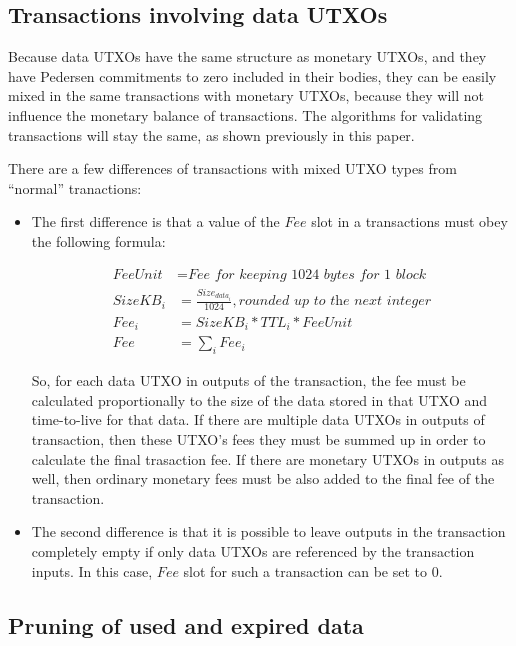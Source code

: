 \documentclass[a4paper, 10pt, conference]{ieeeconf}
\begin{document}
\subsection{Transactions involving data UTXOs}

Because data UTXOs have the same structure as monetary UTXOs, and they have Pedersen commitments to zero included in their bodies, they can be easily mixed in the same transactions with monetary UTXOs, because they will not influence the monetary balance of transactions. The algorithms for validating transactions will stay the same, as shown previously in this paper.

There are a few differences of transactions with mixed UTXO types from ``normal'' tranactions:

\begin{itemize}

	\item{The first difference is that a value of the $Fee$ slot in a transactions must obey the following formula:

	\begin{align*}
		FeeUnit &= \textit{Fee for keeping 1024 bytes for 1 block} \\
		SizeKB_i &= \frac{Size_{data_i}}{1024}, \textit{rounded up to the next integer}\\
		Fee_i &= SizeKB_i * TTL_i * FeeUnit\\
		Fee &= \sum_i Fee_i
	\end{align*}

	So, for each data UTXO in outputs of the transaction, the fee must be calculated proportionally to the size of the data stored in that UTXO and time-to-live for that data. If there are multiple data UTXOs in outputs of transaction, then these UTXO's fees they must be summed up in order to calculate the final trasaction fee. If there are monetary UTXOs in outputs as well, then ordinary monetary fees must be also added to the final fee of the transaction.}

	\item{The second difference is that it is possible to leave outputs in the transaction completely empty if only data UTXOs are referenced by the transaction inputs. In this case, $Fee$ slot for such a transaction can be set to $0$.}
\end{itemize}

\subsection{Pruning of used and expired data}
\end{document}
